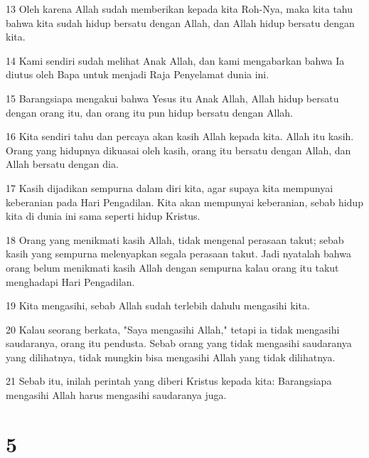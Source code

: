 \par 13 Oleh karena Allah sudah memberikan kepada kita Roh-Nya, maka kita tahu bahwa kita sudah hidup bersatu dengan Allah, dan Allah hidup bersatu dengan kita.
\par 14 Kami sendiri sudah melihat Anak Allah, dan kami mengabarkan bahwa Ia diutus oleh Bapa untuk menjadi Raja Penyelamat dunia ini.
\par 15 Barangsiapa mengakui bahwa Yesus itu Anak Allah, Allah hidup bersatu dengan orang itu, dan orang itu pun hidup bersatu dengan Allah.
\par 16 Kita sendiri tahu dan percaya akan kasih Allah kepada kita. Allah itu kasih. Orang yang hidupnya dikuasai oleh kasih, orang itu bersatu dengan Allah, dan Allah bersatu dengan dia.
\par 17 Kasih dijadikan sempurna dalam diri kita, agar supaya kita mempunyai keberanian pada Hari Pengadilan. Kita akan mempunyai keberanian, sebab hidup kita di dunia ini sama seperti hidup Kristus.
\par 18 Orang yang menikmati kasih Allah, tidak mengenal perasaan takut; sebab kasih yang sempurna melenyapkan segala perasaan takut. Jadi nyatalah bahwa orang belum menikmati kasih Allah dengan sempurna kalau orang itu takut menghadapi Hari Pengadilan.
\par 19 Kita mengasihi, sebab Allah sudah terlebih dahulu mengasihi kita.
\par 20 Kalau seorang berkata, "Saya mengasihi Allah," tetapi ia tidak mengasihi saudaranya, orang itu pendusta. Sebab orang yang tidak mengasihi saudaranya yang dilihatnya, tidak mungkin bisa mengasihi Allah yang tidak dilihatnya.
\par 21 Sebab itu, inilah perintah yang diberi Kristus kepada kita: Barangsiapa mengasihi Allah harus mengasihi saudaranya juga.

\chapter{5}

